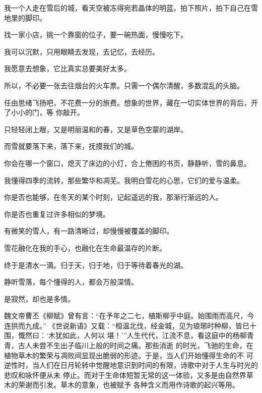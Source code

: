 		我一个人走在雪后的城，看天空被冻得宛若晶体的明蓝。拍下照片，拍下自己在雪地里的脚印。\par
		找一家小店，挑一个靠窗的位子，要一碗热面，慢慢吃下。\par
		我可以沉默，只用眼睛去发现，去记忆，去经历。


		我愿意去想象，它比真实总要美好太多。\par
		所以，不必要一张去往烟台的火车票。只需一个偶尔清醒，多数混乱的头脑。

		任由思绪飞扬吧，不花费一分的旅费。想象的世界，藏在一切实体世界的背后，开了小小的门，等
	你敲开。

		只轻轻闭上眼，又是明丽温和的春，又是草色空蒙的湖岸。\par
		而雪就要落下来，落下来，抚摸我们的城。\par
		你会在哪一个窗口，熄灭了床边的小灯，合上倦困的书页，静静听，雪的鼻息。\par
		我懂得四季的流转，那些繁华和凋芜。我明白雪花的心思，它们的爱与温柔。\par
		你是否也能够，在冬天的某个时刻，记起遥远的我，那渐行渐远的人。\par
		你是否也重复过许多相似的梦境。\par
		有微笑的雪人，有一路清晰过，却慢慢被覆盖的脚印。

		雪花融化在我的手心，也融化在生命最温存的片断。\par
		终于是清水一滴。归于天，归于地，归于等待着春光的湖。

		静听雪落，每个懂得的人，都会万般深情。

	\endwriting



		是寂然，却也是多情。

		魏文帝曹丕《柳赋》曾有言：“在予年之二七，植斯柳乎中庭。始围雨而高尺，今连拱而九成。”
	《世说新语》又载：“桓温北伐，经金城，见为琅琊时种柳，皆已十围，慨然曰：‘木犹如此，人何以
	堪！’”人生代代，江流不息，看这庭中的杨柳青青，古人未尝不生出子临川上般的时间之痛。那些消逝
	的时光，飞驰的生命，在植物草木的繁荣与凋败间显现出脆弱的形迹。于是，当人们开始懂得生命的不
	可逆性时，当人们在日月轮转中觉醒地意识到时间的有限，诗歌中对于人生与时光的悲叹和咏怀便从未
	停止。而对于生命体短暂无常的这一体验，又多是由自然界草木的荣谢而引发。草木的意象，也被赋予
	各种含义而用作诗歌的起兴等用。

